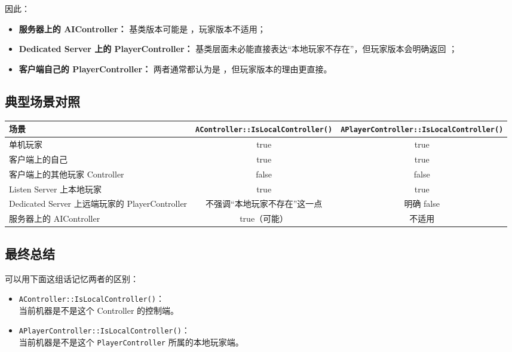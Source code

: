 因此：

\begin{itemize}
	\item\textbf{ 服务器上的 AIController：}	基类版本可能是 ，玩家版本不适用；
	\item \textbf{Dedicated Server 上的 PlayerController：}
	基类层面未必能直接表达“本地玩家不存在”，但玩家版本会明确返回 ；
	\item \textbf{客户端自己的 PlayerController：}
	两者通常都认为是 ，但玩家版本的理由更直接。
\end{itemize}

\subsection{典型场景对照}

\begin{center}\footnotesize
	\renewcommand{\arraystretch}{1.5}
	\begin{tabular}{|p{4.6cm}|c|c|}
		\hline
		\textbf{场景} & \texttt{AController::IsLocalController()} & \texttt{APlayerController::IsLocalController()} \\
		\hline
		单机玩家 & true & true \\
		\hline
		客户端上的自己 & true & true \\
		\hline
		客户端上的其他玩家 Controller & false & false \\
		\hline
		Listen Server 上本地玩家 & true & true \\
		\hline
		Dedicated Server 上远端玩家的 PlayerController & 不强调“本地玩家不存在”这一点 & 明确 false \\
		\hline
		服务器上的 AIController & true（可能） & 不适用 \\
		\hline
	\end{tabular}
\end{center}

\subsection{最终总结}

可以用下面这组话记忆两者的区别：

\begin{itemize}
	\item \texttt{AController::IsLocalController()}：\\
	当前机器是不是这个 Controller 的控制端。
	
	\item \texttt{APlayerController::IsLocalController()}：\\
	当前机器是不是这个 \texttt{PlayerController} 所属的本地玩家端。
\end{itemize}

